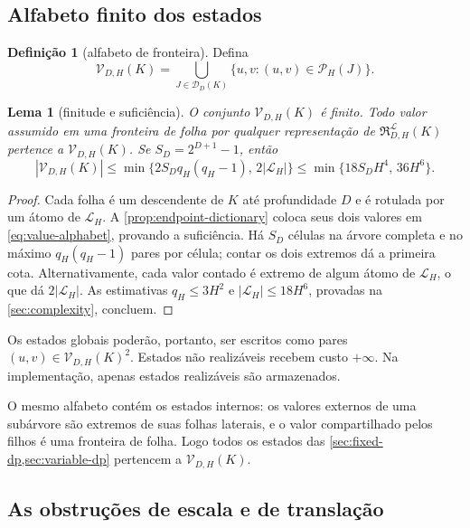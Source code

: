 \documentclass[11pt,a4paper]{article}
\newtheorem{lemma}[theorem]{Lema}
\theoremstyle{definition}
\newtheorem{definition}[theorem]{Definição}
\theoremstyle{remark}
\newcommand{\Library}{\mathcal{L}}
\newcommand{\Representations}{\mathfrak{R}}
\newcommand{\Values}{\mathcal{V}}
\newcommand{\Pairs}{\mathcal{P}}
\begin{document}
\subsection{Alfabeto finito dos estados}

\begin{definition}[alfabeto de fronteira]
\label{def:value-alphabet}
Defina
\begin{equation}
 \Values_{D,H}(K)
 =\bigcup_{J\in\mathcal D_D(K)}
 \{u,v:(u,v)\in\Pairs_H(J)\}.
 \label{eq:value-alphabet}
\end{equation}
\end{definition}

\begin{lemma}[finitude e suficiência]
\label{lem:value-alphabet}
O conjunto $\Values_{D,H}(K)$ é finito. Todo valor assumido em uma fronteira
de folha por qualquer representação de
$\Representations_{D,H}^{\Library}(K)$ pertence a
$\Values_{D,H}(K)$. Se $S_D=2^{D+1}-1$, então
\begin{equation}
 |\Values_{D,H}(K)|
 \le \min\{2S_Dq_H(q_H-1),\,2|\Library_H|\}
 \le \min\{18S_DH^4,\,36H^6\}.
 \label{eq:value-alphabet-bound}
\end{equation}
\end{lemma}

\begin{proof}
Cada folha é um descendente de $K$ até profundidade $D$ e é rotulada por um
átomo de $\Library_H$. A \cref{prop:endpoint-dictionary} coloca seus dois
valores em \eqref{eq:value-alphabet}, provando a suficiência. Há $S_D$ células
na árvore completa e no máximo $q_H(q_H-1)$ pares por célula; contar os dois
extremos dá a primeira cota. Alternativamente, cada valor contado é extremo
de algum átomo de $\Library_H$, o que dá $2|\Library_H|$. As estimativas
$q_H\le3H^2$ e $|\Library_H|\le18H^6$, provadas na \cref{sec:complexity},
concluem.
\end{proof}

Os estados globais poderão, portanto, ser escritos como pares
$(u,v)\in\Values_{D,H}(K)^2$. Estados não realizáveis recebem custo
$+\infty$. Na implementação, apenas estados realizáveis são armazenados.

O mesmo alfabeto contém os estados internos: os valores externos de uma subárvore são extremos de suas folhas laterais, e o valor compartilhado pelos filhos é uma fronteira de folha. Logo todos os estados das \cref{sec:fixed-dp,sec:variable-dp} pertencem a $\Values_{D,H}(K)$.

\subsection{As obstruções de escala e de translação}
\end{document}
